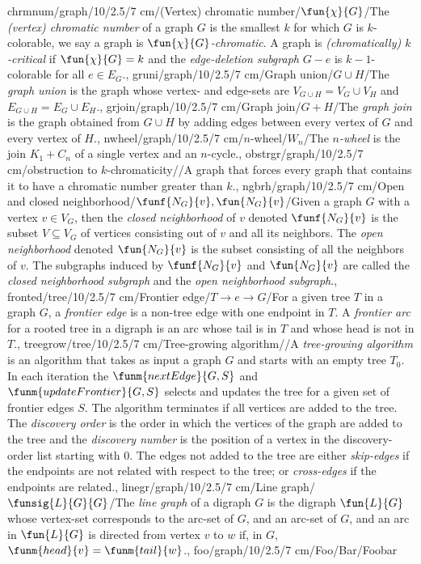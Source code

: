 chrmnum/graph/10/2.5/7 cm/{(Vertex) chromatic number}/{$\fun{\chi}{G}$}/{The \emph{(vertex) chromatic number} of a graph $G$ is the smallest $k$ for which $G$ is $k$-colorable, we say a graph is \emph{$\fun{\chi}{G}$-chromatic}. A graph is \emph{(chromatically) $k$-critical} if $\fun{\chi}{G}=k$ and the \emph{edge-deletion subgraph} $G-e$ is $k-1$-colorable for all $e\in E_G$.},
gruni/graph/10/2.5/7 cm/{Graph union}/{$G\cup H$}/{The \emph{graph union} is the graph whose vertex- and edge-sets are $V_{G\cup H}=V_G\cup V_H$ and $E_{G\cup H}=E_G\cup E_H$.},
grjoin/graph/10/2.5/7 cm/{Graph join}/{$G+H$}/{The \emph{graph join} is the graph obtained from $G\cup H$ by adding edges between every vertex of $G$ and every vertex of $H$.},
nwheel/graph/10/2.5/7 cm/{$n$-wheel}/{$W_n$}/{The \emph{$n$-wheel} is the join $K_1+C_n$ of a single vertex and an $n$-cycle.},
obstrgr/graph/10/2.5/7 cm/{obstruction to $k$-chromaticity}/{}/{A graph that forces every graph that contains it to have a chromatic number greater than $k$.},
ngbrh/graph/10/2.5/7 cm/{Open and closed neighborhood}/{$\funf{N_G}{v},\fun{N_G}{v}$}/{Given a graph $G$ with a vertex $v\in V_G$, then the \emph{closed neighborhood} of $v$ denoted $\funf{N_G}{v}$ is the subset $V\subseteq V_G$ of vertices consisting out of $v$ and all its neighbors. The \emph{open neighborhood} denoted $\fun{N_G}{v}$ is the subset consisting of all the neighbors of $v$. The subgraphs induced by $\funf{N_G}{v}$ and $\fun{N_G}{v}$ are called the \emph{closed neighborhood subgraph} and the \emph{open neighborhood subgraph}.},
fronted/tree/10/2.5/7 cm/{Frontier edge}/{$T\rightarrow e\rightarrow G$}/{For a given tree $T$ in a graph $G$, a \emph{frontier edge} is a non-tree edge with one endpoint in $T$. A \emph{frontier arc} for a rooted tree in a digraph is an arc whose tail is in $T$ and whose head is not in $T$.},
treegrow/tree/10/2.5/7 cm/{Tree-growing algorithm}/{}/{A \emph{tree-growing algorithm} is an algorithm that takes as input a graph $G$ and starts with an empty tree $T_0$. In each iteration the $\funm{nextEdge}{G,S}$ and $\funm{updateFrontier}{G,S}$ selects and updates the tree for a given set of frontier edges $S$. The algorithm terminates if all vertices are added to the tree. The \emph{discovery order} is the order in which the vertices of the graph are added to the tree and the \emph{discovery number} is the position of a vertex in the discovery-order list starting with $0$. The edges not added to the tree are either \emph{skip-edges} if the endpoints are not related with respect to the tree; or \emph{cross-edges} if the endpoints are related.},
linegr/graph/10/2.5/7 cm/{Line graph}/{$\funsig{L}{G}{G}$}/{The \emph{line graph} of a digraph $G$ is the digraph $\fun{L}{G}$ whose vertex-set corresponds to the arc-set of $G$, and an arc-set of $G$, and an arc in $\fun{L}{G}$ is directed from vertex $v$ to $w$ if, in $G$, $\funm{head}{v}=\funm{tail}{w}$.},
foo/graph/10/2.5/7 cm/{Foo}/{Bar}/{Foobar}